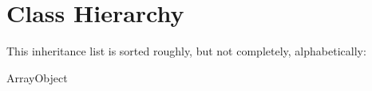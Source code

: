 \section{Class Hierarchy}
This inheritance list is sorted roughly, but not completely, alphabetically\-:\begin{DoxyCompactList}
\item Array\-Object\begin{DoxyCompactList}
\item {}
\end{DoxyCompactList}
\end{DoxyCompactList}
